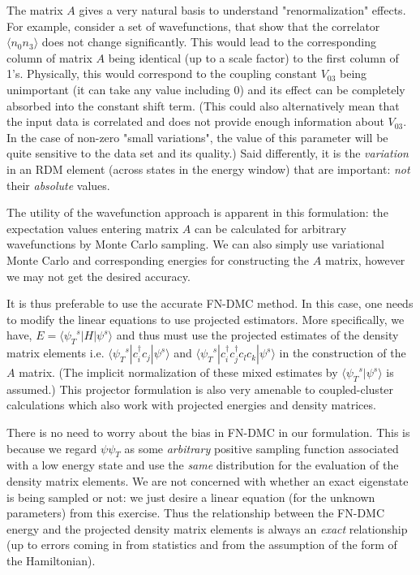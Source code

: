 \documentclass[prl,12pt,onecolumn,nofootinbib,notitlepage,english,superscriptaddress]{revtex4-1}
\begin{document}
The matrix $A$ gives a very natural basis to understand "renormalization" effects.
For example, consider a set of wavefunctions, that show that the correlator 
$\langle n_0 n_3 \rangle$ does not change significantly. This would lead to the 
corresponding column of matrix $A$ being identical (up to a scale factor) 
to the first column of 1's. Physically, this would correspond to the coupling constant 
$V_{03}$ being unimportant (it can take any value including 0) and its 
effect can be completely absorbed into the constant shift term. 
(This could also alternatively mean that the input 
data is correlated and does not provide enough information about $V_{03}$. 
In the case of non-zero "small variations", the value of this parameter 
will be quite sensitive to the data set and its quality.) 
Said differently, it is the \emph{variation}  
in an RDM element (across states in the energy window) 
that are important: \emph{not} their \emph{absolute} values.

The utility of the wavefunction approach is apparent in this 
formulation: the expectation values entering matrix $A$ 
can be calculated for arbitrary wavefunctions by Monte Carlo sampling.
We can also simply use variational Monte Carlo and corresponding energies
for constructing the $A$ matrix, however we may not get the desired accuracy. 

It is thus preferable to use the accurate FN-DMC method. In this case, one needs to modify the linear equations 
to use projected estimators. More specifically, we have, $E= \langle {\psi_T}^{s}| H | {\psi}^s \rangle$ 
and thus must use the projected estimates of the density matrix elements i.e. 
$\langle {\psi_T}^s | c_i^{\dagger} c_j | {\psi}^s \rangle$ and $\langle {\psi_T}^s| c_i^{\dagger}c_j^{\dagger} c_l c_k | {\psi}^s \rangle$ 
in the construction of the $A$ matrix. (The implicit normalization of these 
mixed estimates by $\langle {\psi_T}^s | \psi^{s} \rangle$ is assumed.) 
This projector formulation is also very amenable to 
coupled-cluster calculations which also work with projected energies 
and density matrices.

There is no need to worry about the bias in FN-DMC in our formulation. 
This is because we regard $\psi \psi_T$ as some \emph{arbitrary} positive sampling function 
associated with a low energy state and use the \emph{same} distribution for the 
evaluation of the density matrix elements. We are not concerned with whether 
an exact eigenstate is being sampled or not: we just desire a linear equation 
(for the unknown parameters) from this exercise. Thus the relationship between the FN-DMC energy 
and the projected density matrix elements is always an \emph{exact} relationship 
(up to errors coming in from statistics and from the 
assumption of the form of the Hamiltonian). 
\end{document}
